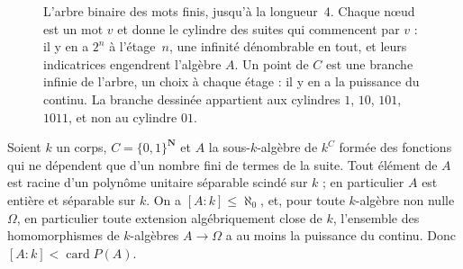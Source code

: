 \begin{figure}[htbp]
\centering
{}
\caption{L'arbre binaire des mots finis, jusqu'à la longueur~$4$. Chaque n\oe ud est un mot $v$ et donne le cylindre des suites qui commencent par $v$ : il y en a $2^n$ à l'étage~$n$, une infinité dénombrable en tout, et leurs indicatrices engendrent l'algèbre $A$. Un point de $C$ est une branche infinie de l'arbre, un choix à chaque étage : il y en a la puissance du continu. La branche dessinée appartient aux cylindres $1$, $10$, $101$, $1011$, et non au cylindre $01$.}
\label{fig:457-cantor}
\end{figure}

\begin{contrexemple}
Soient $k$ un corps, $C = \{0, 1\}^{\mathbf N}$ et $A$ la sous-$k$-algèbre de $k^C$ formée des fonctions qui ne dépendent que d'un nombre fini de termes de la suite. Tout élément de $A$ est racine d'un polynôme unitaire séparable scindé sur $k$ ; en particulier $A$ est entière et séparable sur $k$. On a $[A:k] \leq \aleph_0$, et, pour toute $k$-algèbre non nulle $\Omega$, en particulier toute extension algébriquement close de $k$, l'ensemble des homomorphismes de $k$-algèbres $A \to \Omega$ a au moins la puissance du continu. Donc $[A:k] < \operatorname{card} P(A)$.
\end{contrexemple}

